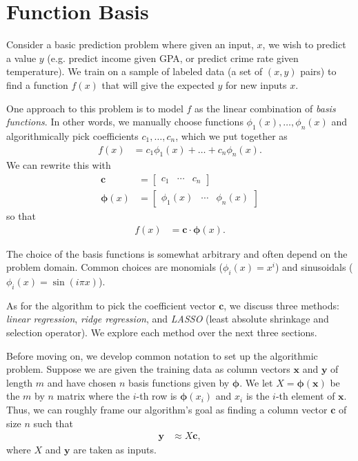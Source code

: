 \documentclass[10pt]{paper}
\begin{document}
\section{Function Basis}
Consider a basic prediction problem where given an input, $x$, we wish to predict a value $y$ (e.g. predict income given GPA, or predict crime rate given temperature). We train on a sample of labeled data (a set of $(x,y)$ pairs) to find a function $f(x)$ that will give the expected $y$ for new inputs $x$.

One approach to this problem is to model $f$ as the linear combination of \emph{basis functions}. In other words, we manually choose functions $\phi_1(x), \dots, \phi_n(x)$ and algorithmically pick coefficients $c_1, \dots, c_n$, which we put together as
\begin{align*}
f(x) &= c_1 \phi_1(x) + \dots + c_n \phi_n(x).
\end{align*}
We can rewrite this with 
\begin{align*}
\bm{c} &= \begin{bmatrix} c_1 & \cdots & c_n \end{bmatrix} \\
\bm{\phi}(x) &= \begin{bmatrix} \phi_1(x) & \cdots & \phi_n(x) \end{bmatrix}
\end{align*}
so that 
\begin{align}
f(x) &= \bm{c} \cdot \bm{\phi}(x). \label{eq:predictor}
\end{align}

The choice of the basis functions is somewhat arbitrary and often depend on the problem domain. Common choices are monomials ($\phi_i(x) = x^i$) and sinusoidals ($\phi_i(x) = \sin(i \pi x)$).

As for the algorithm to pick the coefficient vector $\bm{c}$, we discuss three methods: \emph{linear regression}, \emph{ridge regression}, and \emph{LASSO} (least absolute shrinkage and selection operator). We explore each method over the next three sections.

Before moving on, we develop common notation to set up the algorithmic problem. Suppose we are given the training data as column vectors $\bm{x}$ and $\bm{y}$ of length $m$ and have chosen $n$ basis functions given by $\bm{\phi}$. We let $X = \bm{\phi}(\bm{x})$ be the $m$ by $n$ matrix where the $i$-th row is $\bm{\phi}(x_i)$ and $x_i$ is the $i$-th element of $\bm{x}$. Thus, we can roughly frame our algorithm's goal as finding a column vector $\bm{c}$ of size $n$ such that
\begin{align}
\bm{y} &\approx X \bm{c}, \label{eq:problem}
\end{align}
where $X$ and $\bm{y}$ are taken as inputs.
\end{document}
